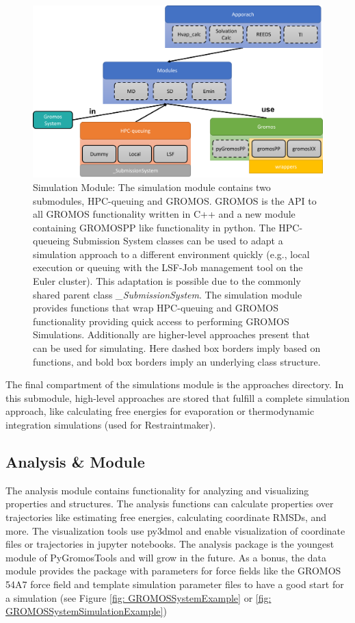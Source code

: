 \begin{figure}[h]
    \centering
    \includegraphics[width=\textwidth]{fig/implementation/Simulation.png}
    \caption{Simulation Module: The simulation module contains two submodules, HPC-queuing and GROMOS. GROMOS is the API to all GROMOS functionality written in C++ and a new module containing GROMOSPP like functionality in python. The HPC-queueing Submission System classes can be used to adapt a simulation approach to a different environment quickly  (e.g., local execution or queuing with the LSF-Job management tool on the Euler cluster). This adaptation is possible due to the commonly shared parent class \textit{\_SubmissionSystem}. The simulation module provides functions that wrap HPC-queuing and GROMOS functionality providing quick access to performing GROMOS Simulations. Additionally are higher-level approaches present that can be used for simulating. Here dashed box borders imply based on functions, and bold box borders imply an underlying class structure.}
    \label{fig: SimulationModule}
\end{figure}

The final compartment of the simulations module is the approaches directory. In this submodule, high-level approaches are stored that fulfill a complete simulation approach, like calculating free energies for evaporation or thermodynamic integration simulations (used for Restraintmaker).

\subsection{Analysis \& Module}
The analysis module contains functionality for analyzing and visualizing properties and structures. The analysis functions can calculate properties over trajectories like estimating free energies, calculating coordinate RMSDs, and more. The visualization tools use py3dmol and enable visualization of coordinate files or trajectories in jupyter notebooks. The analysis package is the youngest module of PyGromosTools and will grow in the future. As a bonus, the data module provides the package with parameters for force fields like the GROMOS 54A7 force field and template simulation parameter files to have a good start for a simulation (see Figure \ref{fig: GROMOSSystemExample} or \ref{fig: GROMOSSystemSimulationExample})
